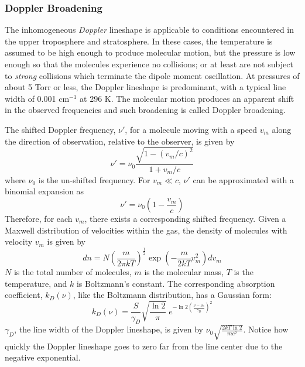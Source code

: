 \documentclass[11pt]{article}
\begin{document}
\subsubsection{Doppler Broadening}\label{sec:doppler}

The inhomogeneous {\it Doppler} lineshape is applicable to conditions 
encountered in 
the upper troposphere and stratosphere.  In these cases, the temperature is 
assumed to be high enough to produce molecular motion, but the pressure is 
low enough so that the molecules experience no collisions; or at least are 
not subject to {\it strong} collisions which terminate the dipole moment 
oscillation.
At pressures of about 5 Torr or less, the Doppler lineshape 
is predominant, with a typical line width of 0.001 cm$^{-1}$ at 296 K. 
The molecular motion produces an apparent shift in the observed frequencies
and such broadening is called Doppler broadening.

The shifted Doppler frequency, $\nu '$, for a molecule moving with a
speed $v_{m}$ along the direction of observation, relative to the observer,
is given by
\begin{equation}
 \nu '=\nu_{0}\frac{\sqrt{1-(v_{m}/c)^{2}}}{1+v_{m}/c}
\end{equation}
where $\nu_{0}$ is the un-shifted frequency. For $v_{m} \ll c$, $\nu '$
can be approximated with a binomial expansion as
\begin{equation}
 \nu '=\nu_{0}\left(1-\frac{v_{m}}{c}\right)
\end{equation}
Therefore, for each $v_{m}$, there exists a corresponding shifted frequency.
Given a Maxwell distribution of velocities within the gas, the density of
molecules with velocity $v_{m}$ is given by
\begin{equation}
 dn=N\left(\frac{m}{2\pi kT}\right)^{\frac{1}{2}}\exp\left(-\frac{m}{2kT}
v_{m}^{2}\right)dv_{m}
\end{equation}
$N$ is the total number of molecules, $m$ is the molecular mass, $T$ is the
temperature, and $k$ is Boltzmann's constant.  The corresponding absorption
coefficient, $k_{D}(\nu)$, like the Boltzmann distribution, has a
Gaussian form:
\begin{equation}
 k_{D}(\nu)=\frac{S}{\gamma_{D}}\sqrt{\frac{\ln 2}{\pi}} \; e^{-\ln 2
  \left(\frac{\nu -\nu_{0}}{\gamma_{D}}\right)^{2}}
\end{equation}
$\gamma_{D}$, the line width of the Doppler lineshape, is given by
$\nu_{0}\sqrt{\frac{2kT \ln 2}{mc^{2}}}$.    Notice how quickly the
Doppler lineshape goes to zero far from the line center due to the negative
exponential.  
\end{document}
